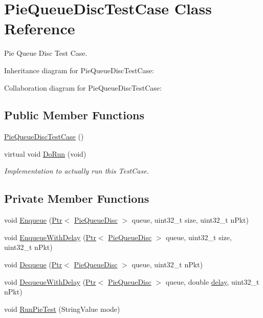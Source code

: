 \hypertarget{classPieQueueDiscTestCase}{}\section{Pie\+Queue\+Disc\+Test\+Case Class Reference}
\label{classPieQueueDiscTestCase}


Pie Queue Disc Test Case.  




Inheritance diagram for Pie\+Queue\+Disc\+Test\+Case\+:


Collaboration diagram for Pie\+Queue\+Disc\+Test\+Case\+:
\subsection*{Public Member Functions}
\begin{DoxyCompactItemize}
\item 
\hyperlink{classPieQueueDiscTestCase_ad9b405e9993a24852e226653ce12fb55}{Pie\+Queue\+Disc\+Test\+Case} ()
\item 
virtual void \hyperlink{classPieQueueDiscTestCase_a6d3523e534f7c31901dc55296402203b}{Do\+Run} (void)
\begin{DoxyCompactList}\small\item\em Implementation to actually run this Test\+Case. \end{DoxyCompactList}\end{DoxyCompactItemize}
\subsection*{Private Member Functions}
\begin{DoxyCompactItemize}
\item 
void \hyperlink{classPieQueueDiscTestCase_adfdcc5ca19dc5059fc95c2b940c19a54}{Enqueue} (\hyperlink{classns3_1_1Ptr}{Ptr}$<$ \hyperlink{classns3_1_1PieQueueDisc}{Pie\+Queue\+Disc} $>$ queue, uint32\+\_\+t size, uint32\+\_\+t n\+Pkt)
\item 
void \hyperlink{classPieQueueDiscTestCase_a6d837dbfe3af8f4a7a1ca4e6ecbbf54e}{Enqueue\+With\+Delay} (\hyperlink{classns3_1_1Ptr}{Ptr}$<$ \hyperlink{classns3_1_1PieQueueDisc}{Pie\+Queue\+Disc} $>$ queue, uint32\+\_\+t size, uint32\+\_\+t n\+Pkt)
\item 
void \hyperlink{classPieQueueDiscTestCase_a3f2148f8c200a2338e33759f6f6ebc07}{Dequeue} (\hyperlink{classns3_1_1Ptr}{Ptr}$<$ \hyperlink{classns3_1_1PieQueueDisc}{Pie\+Queue\+Disc} $>$ queue, uint32\+\_\+t n\+Pkt)
\item 
void \hyperlink{classPieQueueDiscTestCase_ac95d22c3ac6ef3a873d70a663fd964e3}{Dequeue\+With\+Delay} (\hyperlink{classns3_1_1Ptr}{Ptr}$<$ \hyperlink{classns3_1_1PieQueueDisc}{Pie\+Queue\+Disc} $>$ queue, double \hyperlink{mmwave_2model_2fading-traces_2fading__trace__generator_8m_a7964e6aa8f61a9d28973c8267a606ad8}{delay}, uint32\+\_\+t n\+Pkt)
\item 
void \hyperlink{classPieQueueDiscTestCase_a867584b1f677ae346ca8534819ef9be4}{Run\+Pie\+Test} (String\+Value mode)
\end{DoxyCompactItemize}
